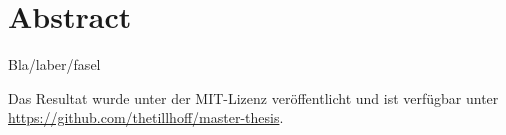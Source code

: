 \titlespacing*{\chapter}{170pt}{0pt}{10pt} %

\chapter*{Abstract}
\begin{addmargin}[2em]{2em}
Bla/laber/fasel
\end{addmargin}

\bigskip
\begin{addmargin}[2em]{2em}
Das Resultat wurde unter der MIT-Lizenz veröffentlicht und ist verfügbar unter \url{https://github.com/thetillhoff/master-thesis}.
\end{addmargin}


\titlespacing*{\chapter}{0pt}{0pt}{10pt} %
